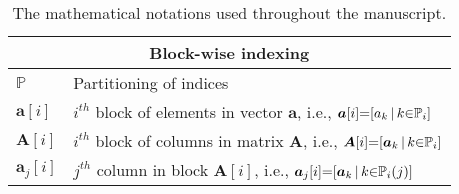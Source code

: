 \begin{table}[hb]
\begin{center}
\begin{tabular}{cc}
\midrule
\multicolumn{2}{c}{Block-wise indexing} \\ 
\midrule
\multicolumn{1}{l}{$\mathbb{P}$} & \multicolumn{1}{l}{Partitioning of indices} \\
\multicolumn{1}{l}{$\boldsymbol{a}[i]$} & \multicolumn{1}{l}{$i^{th}$ block of elements in vector $\boldsymbol{a}$, i.e., $\boldsymbol{a}[i] {=} [a_k \, | \, k {\in} \mathbb{P}_i]$} \\
\multicolumn{1}{l}{$\boldsymbol{A}[i]$} & \multicolumn{1}{l}{$i^{th}$ block of columns in matrix $\boldsymbol{A}$, i.e., $\boldsymbol{A}[i] {=} [\boldsymbol{a}_k \, | \, k {\in} \mathbb{P}_i]$} \\
\multicolumn{1}{l}{$\boldsymbol{a}_j[i]$} & \multicolumn{1}{l}{$j^{th}$ column in block $\boldsymbol{A}[i]$, i.e., $\boldsymbol{a}_j[i] {=} [\boldsymbol{a}_k \, | \, k {\in} \mathbb{P}_i(j)]$} \\
\bottomrule
\end{tabular}
\caption{The mathematical notations used throughout the manuscript.}
\label{table:Mathematical notations}
\end{center} 
\end{table}
\FloatBarrier


